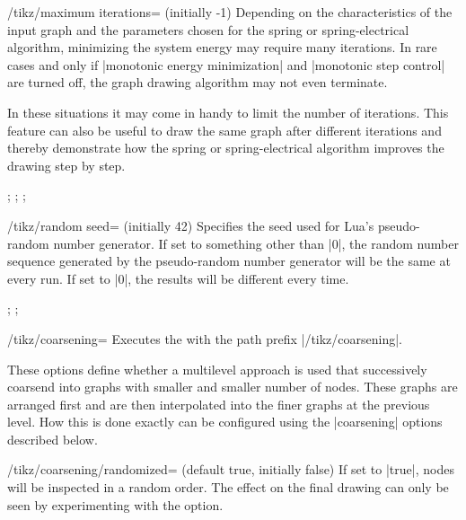 \begin{key}{/tikz/maximum iterations= (initially -1)}
  Depending on the characteristics of the input graph and the parameters
  chosen for the spring or spring-electrical algorithm, minimizing the
  system energy may require many iterations. In rare cases and only if
  |monotonic energy minimization| and |monotonic step control| are
  turned off, the graph drawing algorithm may not even terminate.

  In these situations it may come in handy to limit the number of
  iterations. This feature can also be useful to draw the same graph
  after different iterations and thereby demonstrate how the spring or
  spring-electrical algorithm improves the drawing step by step.
  \begin{codeexample}[]
\tikz {};
\tikz {};
\tikz {};
  \end{codeexample}
\end{key}

\begin{key}{/tikz/random seed= (initially 42)}
  Specifies the seed used for Lua's pseudo-random number generator. If
  set to something other than |0|, the random number sequence generated
  by the pseudo-random number generator will be the same at every run.
  If set to |0|, the results will be different every time.
  \begin{codeexample}[width=5.5cm]
\tikz {};
\tikz {};
  \end{codeexample}
\end{key}

\begin{key}{/tikz/coarsening=}
  Executes the  with the path prefix |/tikz/coarsening|.
  
  These options define whether a multilevel approach is used that
  successively coarsend into graphs with smaller and smaller number
  of nodes. These graphs are arranged first and are then interpolated
  into the finer graphs at the previous level. How this is done exactly
  can be configured using the |coarsening| options described below.
\end{key}

\begin{key}{/tikz/coarsening/randomized= (default
  true, initially false)}
  If set to |true|, nodes will be inspected in a random order. The
  effect on the final drawing can only be seen by experimenting with the
  option.
  \begin{codeexample}[]
  \end{codeexample}
\end{key}

